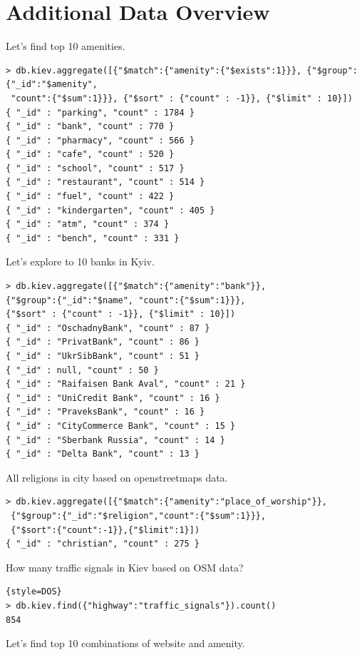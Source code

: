 \documentclass[a4paper,12pt]{article}
\begin{document}
\section*{Additional Data Overview}
Let's find top 10 amenities.
\begin{lstlisting}[style=DOS]
> db.kiev.aggregate([{"$match":{"amenity":{"$exists":1}}}, {"$group":{"_id":"$amenity",
 "count":{"$sum":1}}}, {"$sort" : {"count" : -1}}, {"$limit" : 10}])
{ "_id" : "parking", "count" : 1784 }
{ "_id" : "bank", "count" : 770 }
{ "_id" : "pharmacy", "count" : 566 }
{ "_id" : "cafe", "count" : 520 }
{ "_id" : "school", "count" : 517 }
{ "_id" : "restaurant", "count" : 514 }
{ "_id" : "fuel", "count" : 422 }
{ "_id" : "kindergarten", "count" : 405 }
{ "_id" : "atm", "count" : 374 }
{ "_id" : "bench", "count" : 331 }
\end{lstlisting}
Let's explore to 10 banks in Kyiv.
\begin{lstlisting}[style=DOS]
> db.kiev.aggregate([{"$match":{"amenity":"bank"}}, 
{"$group":{"_id":"$name", "count":{"$sum":1}}}, 
{"$sort" : {"count" : -1}}, {"$limit" : 10}])
{ "_id" : "OschadnyBank", "count" : 87 }
{ "_id" : "PrivatBank", "count" : 86 }
{ "_id" : "UkrSibBank", "count" : 51 }
{ "_id" : null, "count" : 50 }
{ "_id" : "Raifaisen Bank Aval", "count" : 21 }
{ "_id" : "UniCredit Bank", "count" : 16 }
{ "_id" : "PraveksBank", "count" : 16 }
{ "_id" : "CityCommerce Bank", "count" : 15 }
{ "_id" : "Sberbank Russia", "count" : 14 }
{ "_id" : "Delta Bank", "count" : 13 }
\end{lstlisting}
All religions in city based on openstreetmaps data.
\begin{lstlisting}[style=DOS]
> db.kiev.aggregate([{"$match":{"amenity":"place_of_worship"}},
 {"$group":{"_id":"$religion","count":{"$sum":1}}}, 
 {"$sort":{"count":-1}},{"$limit":1}])
{ "_id" : "christian", "count" : 275 }
\end{lstlisting}
How many traffic signals in Kiev based on OSM data?
\begin{lstlisting}{style=DOS}
> db.kiev.find({"highway":"traffic_signals"}).count()
854
\end{lstlisting}
Let's find top 10 combinations of website and amenity.
\end{document}
